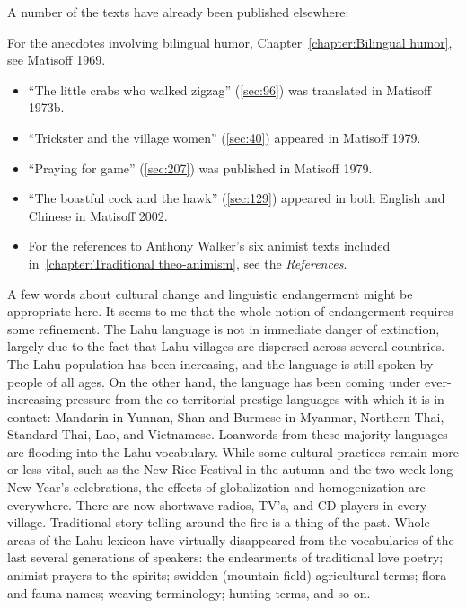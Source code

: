 A number of the texts have already been published elsewhere:

For the anecdotes involving bilingual humor, Chapter~\ref{chapter:Bilingual humor}, see Matisoff 1969.

\begin{itemize}
\item ``The little crabs who walked zigzag'' (\ref{sec:96}) was
  translated in Matisoff 1973b.

\item ``Trickster and the village women'' (\ref{sec:40}) appeared in
  Matisoff 1979.

\item ``Praying for game'' (\ref{sec:207}) was published in Matisoff
  1979.

\item ``The boastful cock and the hawk'' (\ref{sec:129}) appeared in
  both English and Chinese in Matisoff 2002.

\item For the references to Anthony Walker's six animist texts
  included in~\ref{chapter:Traditional theo-animism}, see the
  \emph{References}.

\end{itemize}

A few words about cultural change and linguistic endangerment might be
appropriate here. It seems to me that the whole notion of endangerment
requires some refinement. The Lahu language is not in immediate
danger of extinction, largely due to the fact that Lahu villages are
dispersed across several countries. The Lahu population has been
increasing, and the language is still spoken by people of all ages. On
the other hand, the language has been coming under ever-increasing
pressure from the co-territorial prestige languages with which it is in
contact: Mandarin in Yunnan, Shan and Burmese in Myanmar, Northern Thai,
Standard Thai, Lao, and Vietnamese. Loanwords from these majority
languages are flooding into the Lahu vocabulary. While some cultural
practices remain more or less vital, such as the New Rice Festival in
the autumn and the two-week long New Year's celebrations, the effects of
globalization and homogenization are everywhere. There are now shortwave
radios, TV's, and CD players in every village. Traditional story-telling
around the fire is a thing of the past. Whole areas of the Lahu lexicon
have virtually disappeared from the vocabularies of the last several
generations of speakers: the endearments of traditional love poetry;
animist prayers to the spirits; swidden (mountain-field) agricultural
terms; flora and fauna names; weaving terminology; hunting terms, and so
on.

